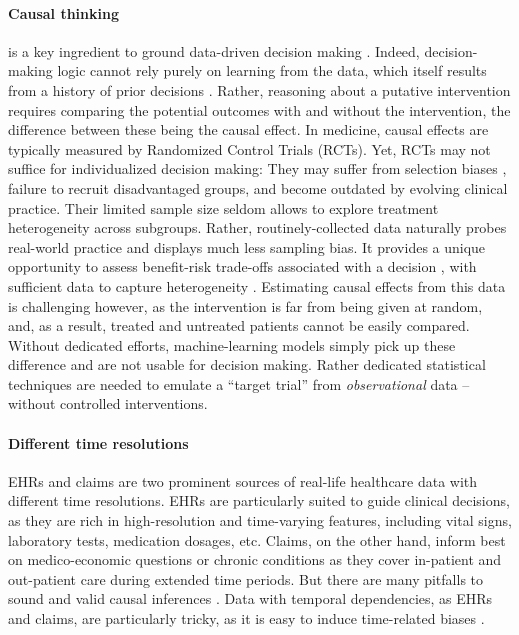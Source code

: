 \documentclass[french,12pt,twoside,a4paper]{book}
\begin{document}
\paragraph{Causal thinking} is a key ingredient to ground data-driven decision making \citep{prosperi2020causal}. Indeed, decision-making logic cannot rely purely on
learning from the data, which itself results from a history of prior
decisions \citep{plecko2022causal}. Rather, reasoning about a putative
intervention requires comparing the potential outcomes with and without the
intervention, the difference between these being the causal
effect.
In medicine, causal effects
are typically measured by Randomized Control Trials
(RCTs).
Yet, RCTs may not suffice for individualized decision making: They
may suffer from selection biases \citep{travers2007external,
  averitt2020translating}, failure to recruit disadvantaged groups, and
become outdated by evolving clinical practice. Their limited sample size
seldom allows to explore treatment heterogeneity across subgroups.
%
Rather, routinely-collected data naturally probes real-world practice and
displays much less sampling bias. It provides a unique opportunity to assess benefit-risk
trade-offs associated with a decision \citep{desai2021broadening}, with
sufficient data to capture heterogeneity \citep{rekkas2023standardized}.
Estimating causal effects from this data is challenging however,
as the intervention is far from being given at random, and,
as a result, treated and untreated patients cannot be easily compared. Without
dedicated efforts, machine-learning models simply pick up these difference and
are not usable for decision making. Rather dedicated statistical
techniques are needed to emulate a ``target trial'' from \emph{observational} data
-- without controlled interventions.

\paragraph{Different time resolutions} EHRs and claims are two prominent sources of real-life healthcare data with different time resolutions.
EHRs are particularly suited to guide clinical decisions, as they are
rich in high-resolution and time-varying features, including vital signs,
laboratory tests, medication dosages, etc. Claims, on the other
hand, inform best on medico-economic questions or
chronic conditions as they cover in-patient and
out-patient care during extended time periods.
%
But there are many pitfalls to sound and valid
causal inferences \citep{hernan2019second, schneeweiss2021conducting}.
%
Data with temporal dependencies, as EHRs and claims, are particularly
tricky, as it is easy to induce time-related biases
\citep{suissa2008immortal,wang2023emulation}.
\end{document}
